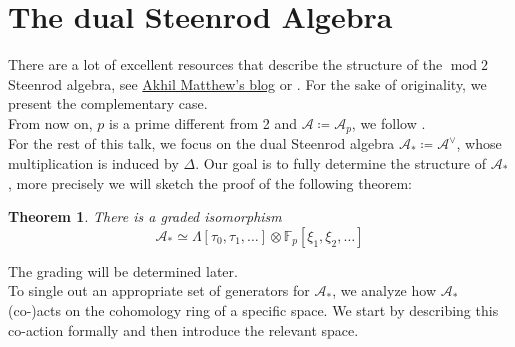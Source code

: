 \documentclass[11pt, a4paper]{article}
\DeclareMathOperator*{\cmod}{mod}
\newtheorem{thm}{Theorem}
\theoremstyle{plain}
\begin{document}
\section{The dual Steenrod Algebra}
There are a lot of excellent resources that describe the structure of the $\cmod 2$ Steenrod algebra, see \href{https://amathew.wordpress.com/2011/11/21/the-dual-steenrod-algebra/}{Akhil Matthew's blog} or \cite[Chap. 6]{coh_ops_and_applications_mosher}. For the sake of originality, we present the complementary case.\\
From now on, $p$ is a prime different from 2 and $\mathcal{A}\coloneq \mathcal{A}_p$, we follow \cite[Chap. 3]{steenrod_algebra_and_its_dual_milnor}.\\

For the rest of this talk, we focus on the dual Steenrod algebra $\mathcal{A}_\ast \coloneq \mathcal{A}^{\vee}$, whose multiplication is induced by $\Delta$. Our goal is to fully determine the structure of $\mathcal{A}_\ast$, more precisely we will sketch the proof of the following theorem:
\begin{thm}
There is a graded isomorphism
\[ 
	\mathcal{A}_\ast \simeq \Lambda[\tau_0,\tau_1,\ldots] \otimes \mathbb{F}_p[\xi_1,\xi_2,\ldots]
\]
\end{thm}
The grading will be determined later.\\

To single out an appropriate set of generators for $\mathcal{A}_\ast$, we analyze how $\mathcal{A}_\ast$ (co-)acts on the cohomology ring of a specific space. We start by describing this co-action formally and then introduce the relevant space.
\end{document}
